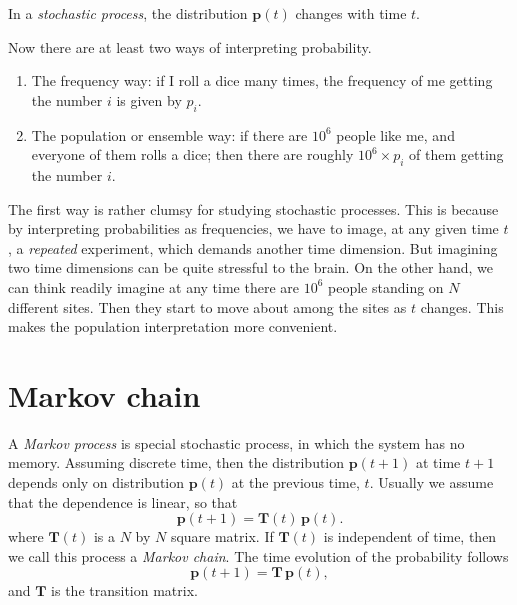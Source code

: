 \documentclass{report}
\begin{document}
In a \emph{stochastic process},
the distribution $\mathbf p(t)$
changes with time $t$.


Now there are at least two ways of
interpreting probability.
%
\begin{enumerate}
  \item
  The frequency way:
  if I roll a dice many times,
  the frequency of me getting the number $i$
  is given by $p_i$.

  \item
  The population or ensemble way:
  if there are $10^6$ people like me,
  and everyone of them rolls a dice;
  then there are roughly $10^6 \times p_i$ of them
  getting the number $i$.

\end{enumerate}


The first way is rather clumsy
for studying stochastic processes.
%
This is because by interpreting probabilities as
frequencies, we have to image, at any given time $t$,
a \emph{repeated} experiment, which demands
another time dimension.
%
But imagining two time dimensions
can be quite stressful to the brain.
%
On the other hand,
we can think readily imagine at any time
there are $10^6$ people standing
on $N$ different sites.
Then they start to move about
among the sites as $t$ changes.
%
This makes the population interpretation
more convenient.



\section{Markov chain}




A \emph{Markov process} is special stochastic process,
in which the system has no memory.
%
Assuming discrete time, then
the distribution $\mathbf p(t+1)$ at time $t + 1$
depends only on distribution
$\mathbf p(t)$ at the previous time, $t$.
%
Usually we assume that the dependence is linear, so that
$$
  \mathbf p(t+1)
  =
  \mathbf T(t) \, \mathbf p(t). 
$$
where $\mathbf T(t)$ is a $N$ by $N$ square matrix.
%
If $\mathbf T(t)$ is independent of time,
then we call this process a \emph{Markov chain}.
%
The time evolution of the probability follows
%
\begin{equation}
  \mathbf p(t+1)
  =
  \mathbf T \, \mathbf p(t),
\label{eq:mcp}
\end{equation}
%
and $\mathbf T$ is the transition matrix.
\end{document}
